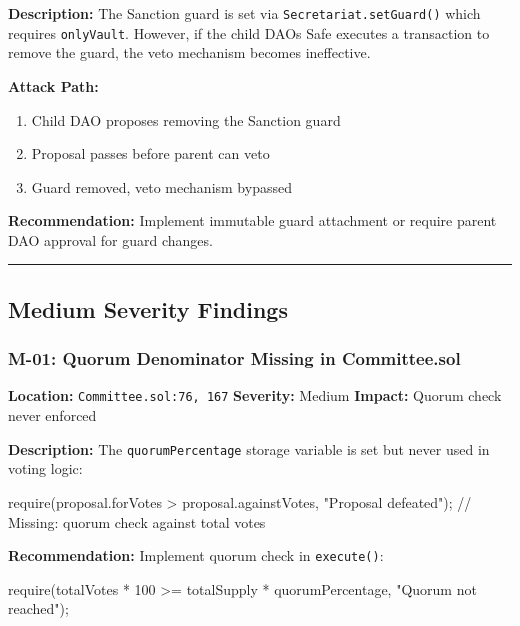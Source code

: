 \documentclass[
]{article}
\newenvironment{Shaded}{}{}
\newcommand{\NormalTok}[1]{#1}
\providecommand{\tightlist}{%
  \setlength{\itemsep}{0pt}\setlength{\parskip}{0pt}}
\begin{document}
\textbf{Description:} The Sanction guard is set via
\texttt{Secretariat.setGuard()} which requires \texttt{onlyVault}.
However, if the child DAO\textquotesingle s Safe executes a transaction
to remove the guard, the veto mechanism becomes ineffective.

\textbf{Attack Path:}

\begin{enumerate}
\def\labelenumi{\arabic{enumi}.}
\tightlist
\item
  Child DAO proposes removing the Sanction guard
\item
  Proposal passes before parent can veto
\item
  Guard removed, veto mechanism bypassed
\end{enumerate}

\textbf{Recommendation:} Implement immutable guard attachment or require
parent DAO approval for guard changes.

\begin{center}\rule{0.5\linewidth}{0.5pt}\end{center}

\subsection{Medium Severity Findings}\label{medium-severity-findings}

\subsubsection{M-01: Quorum Denominator Missing in
Committee.sol}\label{m-01-quorum-denominator-missing-in-committeesol}

\textbf{Location:} \texttt{Committee.sol:76,\ 167} \textbf{Severity:}
Medium \textbf{Impact:} Quorum check never enforced

\textbf{Description:} The \texttt{quorumPercentage} storage variable is
set but never used in voting logic:

\begin{Shaded}
\begin{Highlighting}[]
\NormalTok{require(proposal.forVotes \textgreater{} proposal.againstVotes, "Proposal defeated");}
\NormalTok{// Missing: quorum check against total votes}
\end{Highlighting}
\end{Shaded}

\textbf{Recommendation:} Implement quorum check in \texttt{execute()}:

\begin{Shaded}
\begin{Highlighting}[]
\NormalTok{require(totalVotes * 100 \textgreater{}= totalSupply * quorumPercentage, "Quorum not reached");}
\end{Highlighting}
\end{Shaded}
\end{document}
